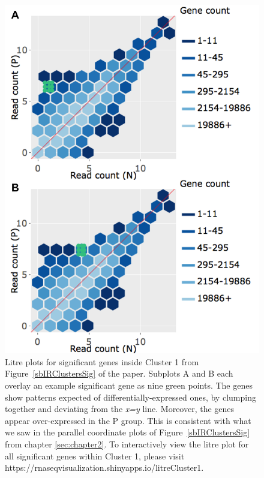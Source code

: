 \documentclass[11pt,a4paper,oldfontcommands,openany]{memoir}
\numberwithin{equation}{section} %
\begin{document}
\clearpage
\null 
\begin{figure}[t!]
\begin{framed}
\centerline{\includegraphics[width=0.7\columnwidth]{MakeFigures/Dashboards/litreCluster1/litreCluster1.jpg}}
\end{framed}
\caption{Litre plots for significant genes inside Cluster 1 from Figure~\ref{sbIRClustersSig} of the paper. Subplots A and B each overlay an example significant gene as nine green points. The genes show patterns expected of differentially-expressed ones, by clumping together and deviating from the \textit{x=y} line. Moreover, the genes appear over-expressed in the P group. This is consistent with what we saw in the parallel coordinate plots of Figure~\ref{sbIRClustersSig} from chapter \ref{sec:chapter2}. To interactively view the litre plot for all significant genes within Cluster 1, please visit https://rnaseqvisualization.shinyapps.io/litreCluster1.
\label{litreCluster1}}
\end{figure}   
\end{document}
